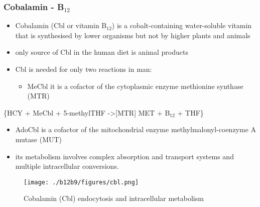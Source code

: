 \documentclass{scrartcl}
\begin{document}
\subsubsection{Cobalamin - B\(_{\text{12}}\)}
\label{sec:org0622ada}
\begin{itemize}
\item Cobalamin (Cbl or vitamin B\(_{\text{12}}\)) is a cobalt-containing
water-soluble vitamin that is synthesised by lower organisms but not
by higher plants and animals
\item only source of Cbl in the human diet is animal products
\item Cbl is needed for only two reactions in man:
\begin{itemize}
\item MeCbl it is a cofactor of the cytoplasmic enzyme methionine synthase (MTR)
\end{itemize}
\end{itemize}
\ce\{HCY + MeCbl + 5-methylTHF ->[MTR] MET + B\(_{\text{12}}\) + THF\}
\begin{itemize}
\item AdoCbl is a cofactor of the mitochondrial enzyme methylmalonyl-coenzyme A mutase (MUT)
\end{itemize}
\begin{itemize}
\item its metabolism involves complex absorption and transport systems and
multiple intracellular conversions.
\end{itemize}


\begin{figure}[htbp]
\centering
\texttt{[image: ./b12b9/figures/cbl.png]}
\caption{\label{fig:orgdd238d7}
Cobalamin (Cbl) endocytosis and intracellular metabolism}
\end{figure}
\end{document}
